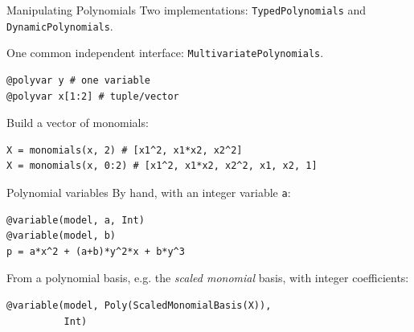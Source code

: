 \documentclass[final]{beamer}
\newlength{\onecolwid}
\begin{document}
\begin{frame}[t,fragile]
\begin{columns}[t]
\begin{column}{\onecolwid} %
  \begin{block}{Manipulating Polynomials}
    Two implementations:
        \texttt{TypedPolynomials} and
        \texttt{DynamicPolynomials}.

    One common independent interface: \texttt{MultivariatePolynomials}.
\begin{verbatim}
@polyvar y # one variable
@polyvar x[1:2] # tuple/vector
\end{verbatim}
    Build a vector of monomials:
\begin{verbatim}
X = monomials(x, 2) # [x1^2, x1*x2, x2^2]
X = monomials(x, 0:2) # [x1^2, x1*x2, x2^2, x1, x2, 1]
\end{verbatim}
  \end{block}

  \begin{block}{Polynomial variables}
    By hand, with an integer variable \texttt{a}:
\begin{verbatim}
@variable(model, a, Int)
@variable(model, b)
p = a*x^2 + (a+b)*y^2*x + b*y^3
\end{verbatim}
    From a polynomial basis, e.g. the
    \emph{scaled monomial} basis,
    with integer coefficients:
\begin{verbatim}
@variable(model, Poly(ScaledMonomialBasis(X)),
          Int)
\end{verbatim}
  \end{block}


\end{column}
\end{columns}
\end{frame}
\end{document}
